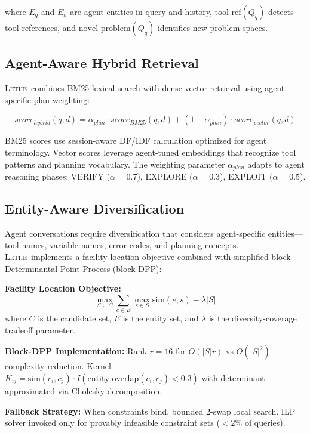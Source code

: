 \documentclass[letterpaper]{article}
\newcommand{\lethe}{\textsc{Lethe}}
\begin{document}
where $E_q$ and $E_h$ are agent entities in query and history, $\text{tool-ref}(Q_q)$ detects tool references, and $\text{novel-problem}(Q_q)$ identifies new problem spaces.

\subsection{Agent-Aware Hybrid Retrieval}

\lethe\ combines BM25 lexical search with dense vector retrieval using agent-specific plan weighting:

\begin{equation}
score_{hybrid}(q, d) = \alpha_{plan} \cdot score_{BM25}(q, d) + (1 - \alpha_{plan}) \cdot score_{vector}(q, d)
\end{equation}

BM25 scores use session-aware DF/IDF calculation optimized for agent terminology. Vector scores leverage agent-tuned embeddings that recognize tool patterns and planning vocabulary. The weighting parameter $\alpha_{plan}$ adapts to agent reasoning phases: VERIFY ($\alpha = 0.7$), EXPLORE ($\alpha = 0.3$), EXPLOIT ($\alpha = 0.5$).

\subsection{Entity-Aware Diversification}

Agent conversations require diversification that considers agent-specific entities—tool names, variable names, error codes, and planning concepts. \lethe\ implements a facility location objective combined with simplified block-Determinantal Point Process (block-DPP):

\textbf{Facility Location Objective:}
\begin{equation}
\max_{S \subseteq C} \sum_{e \in E} \max_{s \in S} \text{sim}(e, s) - \lambda |S|
\end{equation}
where $C$ is the candidate set, $E$ is the entity set, and $\lambda$ is the diversity-coverage tradeoff parameter.

\textbf{Block-DPP Implementation:} Rank $r = 16$ for $O(|S|r)$ vs $O(|S|^2)$ complexity reduction. Kernel $K_{ij} = \text{sim}(c_i, c_j) \cdot I(\text{entity\_overlap}(c_i, c_j) < 0.3)$ with determinant approximated via Cholesky decomposition.

\textbf{Fallback Strategy:} When constraints bind, bounded 2-swap local search. ILP solver invoked only for provably infeasible constraint sets ($<2\%$ of queries).
\end{document}
